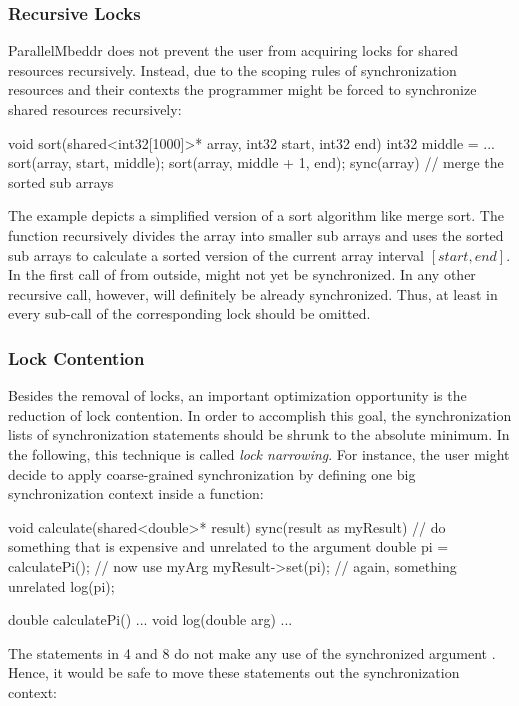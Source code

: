 \subsubsection{Recursive Locks}
ParallelMbeddr does not prevent the user from acquiring locks for shared resources recursively. Instead, due to the scoping rules of synchronization resources and their contexts the programmer might be forced to synchronize shared resources recursively:
\begin{ccode}
void sort(shared<int32[1000]>* array, int32 start, int32 end)
int32 middle = ...
sort(array, start, middle);
sort(array, middle + 1, end);
sync(array) {
  // merge the sorted sub arrays
}
\end{ccode}
The example depicts a simplified version of a sort algorithm like merge sort. The function  recursively divides the array into smaller sub arrays and uses the sorted sub arrays to calculate a sorted version of the current array interval $[start, end]$. In the first call of  from outside,  might not yet be synchronized. In any other recursive call, however,  will definitely be already synchronized. Thus, at least in every sub-call of  the corresponding lock should be omitted.

\subsubsection{Lock Contention}
Besides the removal of locks, an important optimization opportunity is the reduction of lock contention. In order to accomplish this goal, the synchronization lists of synchronization statements should be shrunk to the absolute minimum. In the following, this technique is called \textit{lock narrowing}. For instance, the user might decide to apply coarse-grained synchronization by defining one big synchronization context inside a function:

\begin{ccode}
void calculate(shared<double>* result) {
  sync(result as myResult) {
    // do something that is expensive and unrelated to the argument
    double pi = calculatePi();
    // now use myArg
    myResult->set(pi);
    // again, something unrelated
    log(pi);
  }
}

double calculatePi() {...}
void log(double arg) {...}
\end{ccode}

The statements in 4 and 8 do not make any use of the synchronized argument . Hence, it would be safe to move these statements out the synchronization context:

